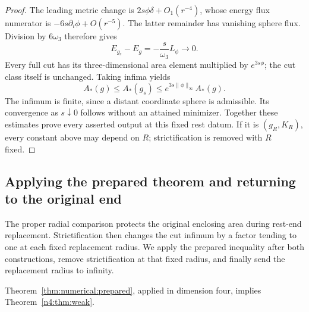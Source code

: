 \begin{proof}
The leading metric change is $2s\phi\delta+O_1(r^{-4})$, whose energy
flux numerator is $-6s\partial_i\phi+O(r^{-5})$. The latter remainder
has vanishing sphere flux. Division by $6\omega_3$ therefore gives
\begin{equation}\label{n4:eq:strictification-energy}
 E_{g_s}-E_g=-\frac{s}{\omega_3}L_\phi\longrightarrow0.
\end{equation}
Every full cut has its three-dimensional area element multiplied by
$e^{3s\phi}$; the cut class itself is unchanged. Taking infima yields
\begin{equation}\label{n4:eq:strictification-area}
 A_*(g)\le A_*(g_s)\le e^{3s\|\phi\|_\infty}A_*(g).
\end{equation}
The infimum is finite, since a distant coordinate sphere is admissible.
Its convergence as $s\downarrow0$ follows without an attained minimizer.
Together these estimates prove every asserted output at this fixed rest
datum. If it is $(g_R,K_R)$, every constant above may depend on $R$;
strictification is removed with $R$ fixed.
\end{proof}

\subsection{Applying the prepared theorem and returning to the original end}

The proper radial comparison protects the original enclosing area during
rest-end replacement. Strictification then changes the cut infimum by a
factor tending to one at each fixed replacement radius. We apply the
prepared inequality after both constructions, remove strictification at
that fixed radius, and finally send the replacement radius to infinity.

\begin{proposition}\label{n4:end:transfer}
Theorem~\ref{thm:numerical:prepared}, applied in dimension four,
implies Theorem~\ref{n4:thm:weak}.
\end{proposition}

